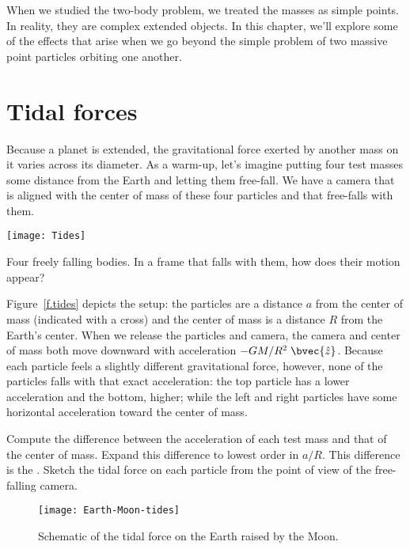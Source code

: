 
When we studied the two-body problem, we treated the masses as simple points. In reality, they are complex extended objects.  In this chapter, we'll explore some of the effects that arise when we go beyond the simple problem of two massive point particles orbiting one another. 

\section{Tidal forces}
Because a planet is extended, the gravitational force exerted by another mass on it varies across its diameter. As a warm-up, let's imagine putting four test masses some distance from the Earth and letting them free-fall.  We have a camera that is aligned with the center of mass of these four particles and that free-falls with them.
\begin{marginfigure}
\texttt{[image: Tides]}
\caption[Four freely falling bodies]{Four freely falling bodies.  In a frame that falls with them, how does their motion appear?
\label{f.tides}}
\end{marginfigure}

Figure~\ref{f.tides} depicts the setup: the particles are a distance $a$ from the center of mass (indicated with a cross) and the center of mass is a distance $R$ from the Earth's center.
When we release the particles and camera, the camera and center of mass both move downward with acceleration $-GM/R^{2}\;\bvec{\hat{z}}$.  Because each particle feels a slightly different gravitational force, however, none of the particles falls with that exact acceleration: the top particle has a lower acceleration and the bottom, higher; while the left and right particles have some horizontal acceleration 
toward the center of mass.

\begin{exercisebox}
\label{ex:simple-tidal}
Compute the difference between the acceleration of each test mass and that of the center of mass.  Expand this difference to lowest order in $a/R$.  This difference is the .  Sketch the tidal force on each particle from the point of view of the free-falling camera.
\end{exercisebox}

\begin{figure*}[hbtp]
\texttt{[image: Earth-Moon-tides]}
\caption[Tidal force on the Earth]{Schematic of the tidal force on the Earth raised by the Moon.
\label{f.Earth-Moon-tides}}
\end{figure*}

